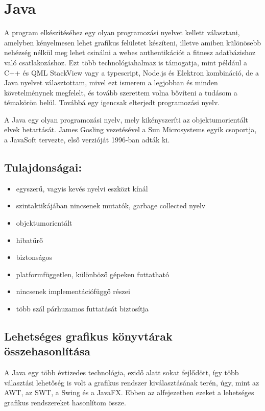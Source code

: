\section{Java}

A program elkészítéséhez egy olyan programozási nyelvet kellett választani, amelyben kényelmesen lehet grafikus felületet készíteni, illetve amiben különösebb nehézség nélkül meg lehet csinálni a webes authentikációt a fitnesz adatbázishoz való csatlakozáshoz.
Ezt több technológiahalmaz is támogatja, mint például a C++ és QML StackView vagy a typescript, Node.js és Elektron kombináció, de a Java nyelvet választottam, mivel ezt ismerem a legjobban és minden követelménynek megfelelt, és tovább szerettem volna bővíteni a tudásom a témakörön belül.
Továbbá egy igencsak elterjedt programozási nyelv.

A Java  egy olyan programozási nyelv, mely kikényszeríti az objektumorientált elvek betartását.
James Gosling vezetésével a Sun Microsystems egyik csoportja, a JavaSoft tervezte, első verzióját 1996-ban adták ki.\cite{java}


\subsection*{Tulajdonságai:}
\begin{itemize}
\item egyszerű, vagyis kevés nyelvi eszközt kínál
\item szintaktikájában nincsenek mutatók, garbage collected nyelv
\item objektumorientált
\item hibatűrő
\item biztonságos
\item platformfüggetlen, különböző gépeken futtatható
\item nincsenek implementációfüggő részei
\item több szál párhuzamos futtatását biztosítja
\end{itemize}

\subsection{Lehetséges grafikus könyvtárak összehasonlítása}

A Java egy több évtizedes technológia, ezidő alatt sokat fejlődött, így több választási lehetőség is volt a grafikus rendszer kiválasztásának terén, úgy, mint az AWT, az SWT, a Swing és a JavaFX.
Ebben az alfejezetben ezeket a lehetséges grafikus rendszereket hasonlítom össze. 

